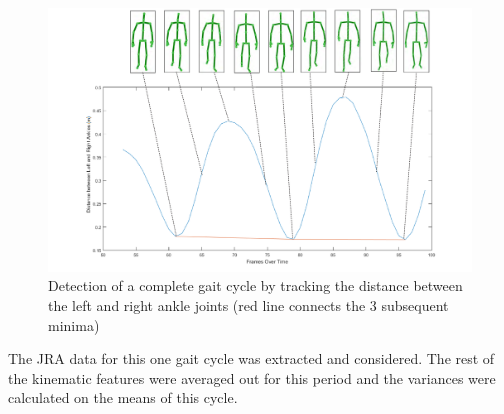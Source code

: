 \begin{figure}[h]
\centering
\includegraphics[scale=0.15]{oneGaitCycle.png}
\caption{Detection of a complete gait cycle by tracking the distance between the left and right ankle joints (red line connects the 3 subsequent minima)}
\end{figure}

\noindent The JRA data for this one gait cycle was extracted and considered. The rest of the kinematic features were averaged out for this period and the variances were calculated on the means of this cycle.\\
\newpage
